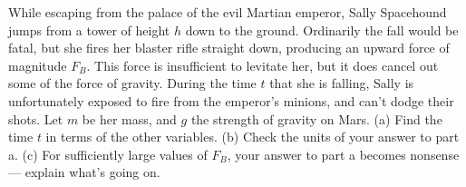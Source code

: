 While escaping from the palace of the evil Martian
emperor, Sally Spacehound jumps from a tower of height $h$
down to the ground. Ordinarily the fall would be fatal, but
she fires her blaster rifle straight down, producing an
upward force of magnitude $F_B$. This force is insufficient to levitate
her, but it does cancel out some of the force of gravity.
During the time $t$ that she is falling, Sally is unfortunately
exposed to fire from the emperor's minions, and can't dodge
their shots. Let $m$ be her mass, and $g$ the strength of
gravity on Mars.\hwendpart
 (a) Find the time $t$ in terms of the other
variables.\hwendpart
%
(b) Check the units of your answer to part a.\hwendpart
 (c) For sufficiently large values of $F_B$, your
answer to part a becomes nonsense --- explain what's going on.\answercheck\hwendpart
